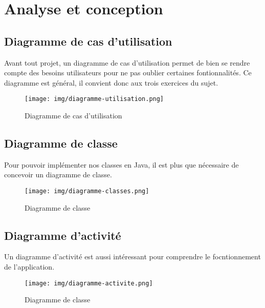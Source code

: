 \section{Analyse et conception}

\subsection{Diagramme de cas d'utilisation}


Avant tout projet, un diagramme de cas d'utilisation permet de bien se rendre compte des besoins utilisateurs pour ne pas oublier certaines fontionnalités. Ce diagramme est général, il convient donc aux trois exercices du sujet.

\begin{figure}[h]
    \centering
    \texttt{[image: img/diagramme-utilisation.png]}
    \caption{Diagramme de cas d'utilisation}
\end{figure}


\subsection{Diagramme de classe}

Pour pouvoir implémenter nos classes en Java, il est plus que nécessaire de concevoir un diagramme de classe.

\begin{figure}[h]
    \centering
    \texttt{[image: img/diagramme-classes.png]}
    \caption{Diagramme de classe}
\end{figure}


\subsection{Diagramme d'activité}

Un diagramme d'activité est aussi intéressant pour comprendre le focntionnement de l'application.

\begin{figure}[h]
    \centering
    \texttt{[image: img/diagramme-activite.png]}
    \caption{Diagramme de classe}
\end{figure}



